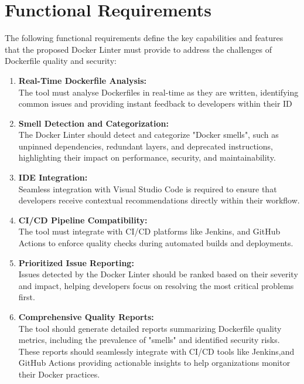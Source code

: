 \section{Functional Requirements}
The following functional requirements define the key capabilities and features that the proposed Docker Linter must provide to address the challenges of Dockerfile quality and security: 
\begin{enumerate}
    \item \textbf{Real-Time Dockerfile Analysis:}\\The tool must analyse Dockerfiles in real-time as they are written, identifying common issues and providing instant feedback to developers within their ID
    \item \textbf{Smell Detection and Categorization:}\\The Docker Linter should detect and categorize "Docker smells", such as unpinned dependencies, redundant layers, and deprecated instructions, highlighting their impact on performance, security, and maintainability.
    \item \textbf{IDE Integration:}\\Seamless integration with Visual Studio Code is required to ensure that developers receive contextual recommendations directly within their workflow.
    \item \textbf{CI/CD Pipeline Compatibility:}\\The tool must integrate with CI/CD platforms like Jenkins, and GitHub Actions to enforce quality checks during automated builds and deployments.
    \item \textbf{Prioritized Issue Reporting:}\\Issues detected by the Docker Linter should be ranked based on their severity and impact, helping developers focus on resolving the most critical problems first.
    \item \textbf{Comprehensive Quality Reports:}\\The tool should generate detailed reports summarizing Dockerfile quality metrics, including the prevalence of "smells" and identified security risks. These reports should seamlessly integrate with CI/CD tools like Jenkins,and GitHub Actions providing actionable insights to help organizations monitor their Docker practices.
\end{enumerate}

